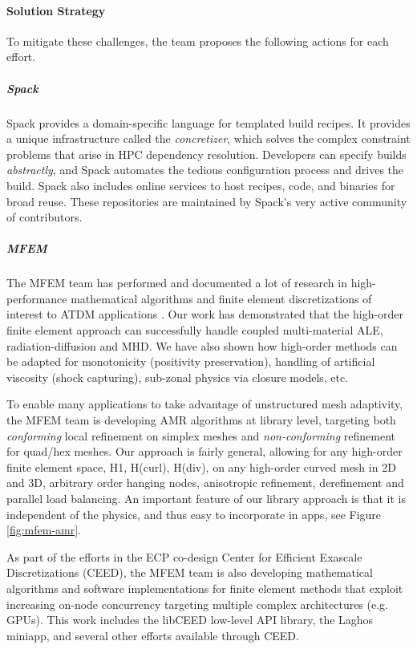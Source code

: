 \paragraph{Solution Strategy} %
To mitigate these challenges, the team proposes the following actions for each effort.

\subparagraph{Spack}
Spack provides a domain-specific language for templated build recipes.
It provides a unique infrastructure called the {\it concretizer}, which
solves the complex constraint problems that arise in HPC dependency
resolution.  Developers can specify builds {\it abstractly}, and Spack
automates the tedious configuration process and drives the build. Spack
also includes online services to host recipes, code, and binaries for
broad reuse.  These repositories are maintained by Spack's very active
community of contributors.

\subparagraph{MFEM}
The MFEM team has performed and documented a lot of research in
high-performance mathematical algorithms and finite element discretizations
of interest to ATDM applications
\cite{BLAST18,BLASTFCT18,BLASTFCT17,BLAST16,BLAST14,BLAST13,BLAST12,BLAST11}.
Our work has demonstrated that the high-order finite element approach can
successfully handle coupled multi-material ALE, radiation-diffusion and MHD.
We have also shown how high-order methods can be adapted for monotonicity
(positivity preservation), handling of artificial viscosity (shock capturing),
sub-zonal physics via closure models, etc.

To enable many applications to take advantage of unstructured mesh adaptivity,
the MFEM team is developing AMR algorithms at library level, targeting both
{\em conforming} local refinement on simplex meshes and {\em non-conforming}
refinement for quad/hex meshes. Our approach is fairly general, allowing for
any high-order finite element space, H1, H(curl), H(div), on any high-order
curved mesh in 2D and 3D, arbitrary order hanging nodes, anisotropic refinement,
derefinement and parallel load balancing.
An important feature of our library approach is that it is independent of
the physics, and thus easy to incorporate in apps, see Figure \ref{fig:mfem-amr}.

As part of the efforts in the ECP co-design Center for Efficient Exascale
Discretizations (CEED), the MFEM team is also developing mathematical algorithms
and software implementations for finite element methods that exploit increasing
on-node concurrency targeting multiple complex architectures (e.g. GPUs). This
work includes the libCEED low-level API library, the Laghos miniapp, and several
other efforts available through CEED.

